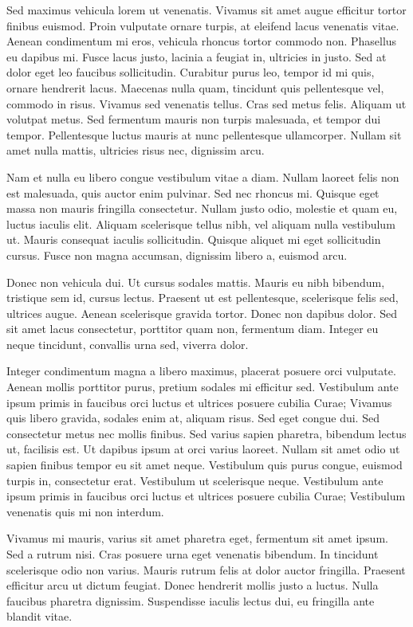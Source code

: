 \documentclass[a4paper,10pt,twoside]{article} %
\begin{document}
Sed maximus vehicula lorem ut venenatis.
Vivamus sit amet augue efficitur tortor finibus euismod.
Proin vulputate ornare turpis, at eleifend lacus venenatis vitae.
Aenean condimentum mi eros, vehicula rhoncus tortor commodo non.
Phasellus eu dapibus mi.
Fusce lacus justo, lacinia a feugiat in, ultricies in justo.
Sed at dolor eget leo faucibus sollicitudin.
Curabitur purus leo, tempor id mi quis, ornare hendrerit lacus.
Maecenas nulla quam, tincidunt quis pellentesque vel, commodo in risus.
Vivamus sed venenatis tellus.
Cras sed metus felis.
Aliquam ut volutpat metus.
Sed fermentum mauris non turpis malesuada, et tempor dui tempor.
Pellentesque luctus mauris at nunc pellentesque ullamcorper.
Nullam sit amet nulla mattis, ultricies risus nec, dignissim arcu.

Nam et nulla eu libero congue vestibulum vitae a diam.
Nullam laoreet felis non est malesuada, quis auctor enim pulvinar.
Sed nec rhoncus mi.
Quisque eget massa non mauris fringilla consectetur.
Nullam justo odio, molestie et quam eu, luctus iaculis elit.
Aliquam scelerisque tellus nibh, vel aliquam nulla vestibulum ut.
Mauris consequat iaculis sollicitudin.
Quisque aliquet mi eget sollicitudin cursus.
Fusce non magna accumsan, dignissim libero a, euismod arcu.

Donec non vehicula dui.
Ut cursus sodales mattis.
Mauris eu nibh bibendum, tristique sem id, cursus lectus.
Praesent ut est pellentesque, scelerisque felis sed, ultrices augue.
Aenean scelerisque gravida tortor.
Donec non dapibus dolor.
Sed sit amet lacus consectetur, porttitor quam non, fermentum diam.
Integer eu neque tincidunt, convallis urna sed, viverra dolor.

Integer condimentum magna a libero maximus, placerat posuere orci vulputate.
Aenean mollis porttitor purus, pretium sodales mi efficitur sed.
Vestibulum ante ipsum primis in faucibus orci luctus et ultrices posuere cubilia Curae; Vivamus quis libero gravida, sodales enim at, aliquam risus.
Sed eget congue dui.
Sed consectetur metus nec mollis finibus.
Sed varius sapien pharetra, bibendum lectus ut, facilisis est.
Ut dapibus ipsum at orci varius laoreet.
Nullam sit amet odio ut sapien finibus tempor eu sit amet neque.
Vestibulum quis purus congue, euismod turpis in, consectetur erat.
Vestibulum ut scelerisque neque.
Vestibulum ante ipsum primis in faucibus orci luctus et ultrices posuere cubilia Curae; Vestibulum venenatis quis mi non interdum.

Vivamus mi mauris, varius sit amet pharetra eget, fermentum sit amet ipsum.
Sed a rutrum nisi.
Cras posuere urna eget venenatis bibendum.
In tincidunt scelerisque odio non varius.
Mauris rutrum felis at dolor auctor fringilla.
Praesent efficitur arcu ut dictum feugiat.
Donec hendrerit mollis justo a luctus.
Nulla faucibus pharetra dignissim.
Suspendisse iaculis lectus dui, eu fringilla ante blandit vitae.
\end{document}
